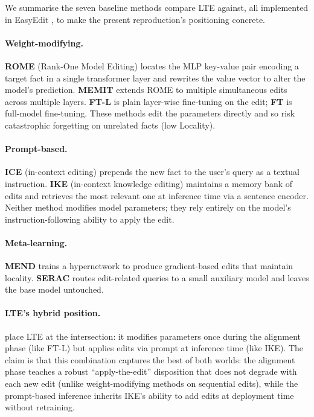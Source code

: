 \documentclass[11pt,a4paper,twocolumn]{article}
\begin{document}
We summarise the seven baseline methods \citet{jiang2024learning} compare LTE against, all implemented in EasyEdit \citep{wang2024easyedit}, to make the present reproduction's positioning concrete.

\paragraph{Weight-modifying.} \textbf{ROME} (Rank-One Model Editing) locates the MLP key-value pair encoding a target fact in a single transformer layer and rewrites the value vector to alter the model's prediction. \textbf{MEMIT} extends ROME to multiple simultaneous edits across multiple layers. \textbf{FT-L} is plain layer-wise fine-tuning on the edit; \textbf{FT} is full-model fine-tuning. These methods edit the parameters directly and so risk catastrophic forgetting on unrelated facts (low Locality).

\paragraph{Prompt-based.} \textbf{ICE} (in-context editing) prepends the new fact to the user's query as a textual instruction. \textbf{IKE} (in-context knowledge editing) maintains a memory bank of edits and retrieves the most relevant one at inference time via a sentence encoder. Neither method modifies model parameters; they rely entirely on the model's instruction-following ability to apply the edit.

\paragraph{Meta-learning.} \textbf{MEND} trains a hypernetwork to produce gradient-based edits that maintain locality. \textbf{SERAC} routes edit-related queries to a small auxiliary model and leaves the base model untouched.

\paragraph{LTE's hybrid position.} \citet{jiang2024learning} place LTE at the intersection: it modifies parameters once during the alignment phase (like FT-L) but applies edits via prompt at inference time (like IKE). The claim is that this combination captures the best of both worlds: the alignment phase teaches a robust ``apply-the-edit'' disposition that does not degrade with each new edit (unlike weight-modifying methods on sequential edits), while the prompt-based inference inherits IKE's ability to add edits at deployment time without retraining.
\end{document}
